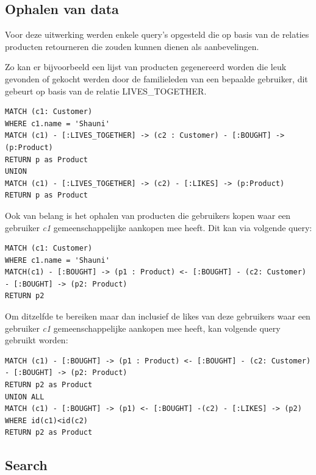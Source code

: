 \subsection{Ophalen van data}
\label{sec:Neo4j Ophalen van data}

Voor deze uitwerking werden enkele query's opgesteld die op basis van de relaties producten retourneren die zouden kunnen dienen als aanbevelingen.

Zo kan er bijvoorbeeld een lijst van producten gegenereerd worden die leuk gevonden of gekocht werden door de familieleden van een bepaalde gebruiker, dit gebeurt op basis van de relatie LIVES\_TOGETHER.

\begin{lstlisting}[caption={Neo4j query die alle likes en aankopen van de familie van een bepaalde gebruiker c1 weergeeft}]
MATCH (c1: Customer)
WHERE c1.name = 'Shauni'
MATCH (c1) - [:LIVES_TOGETHER] -> (c2 : Customer) - [:BOUGHT] -> (p:Product)
RETURN p as Product
UNION
MATCH (c1) - [:LIVES_TOGETHER] -> (c2) - [:LIKES] -> (p:Product)
RETURN p as Product
\end{lstlisting}

Ook van belang is het ophalen van producten die gebruikers kopen waar een gebruiker \textit{c1} gemeenschappelijke aankopen mee heeft. Dit kan via volgende query:

\begin{lstlisting}[caption={Neo4j query die de aankopen van gebruikers weergeeft waar een gebruiker c1 gemeenschappelijke aankopen mee heeft}]
MATCH (c1: Customer)
WHERE c1.name = 'Shauni'
MATCH(c1) - [:BOUGHT] -> (p1 : Product) <- [:BOUGHT] - (c2: Customer) - [:BOUGHT] -> (p2: Product)
RETURN p2
\end{lstlisting}

Om ditzelfde te bereiken maar dan inclusief de likes van deze gebruikers waar een gebruiker \textit{c1} gemeenschappelijke aankopen mee heeft, kan volgende query gebruikt worden: 

\begin{lstlisting}[caption={Neo4j query die de aankopen en likes van gebruikers weergeeft waar een gebruiker c1 gemeenschappelijke aankopen mee heeft}]
MATCH (c1) - [:BOUGHT] -> (p1 : Product) <- [:BOUGHT] - (c2: Customer) - [:BOUGHT] -> (p2: Product)
RETURN p2 as Product
UNION ALL
MATCH (c1) - [:BOUGHT] -> (p1) <- [:BOUGHT] -(c2) - [:LIKES] -> (p2) 
WHERE id(c1)<id(c2)
RETURN p2 as Product
\end{lstlisting}


\subsection{Search}
\label{subsec: Search Neo4j}

